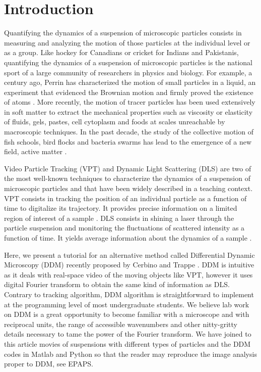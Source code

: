 \documentclass[prb,twocolumn,amsmath,amssymb]{revtex4-1}
\newcommand{\tgn}[1]{{\color{blue}#1}} %
\begin{document}
\section{\label{sec:level1}Introduction}

Quantifying the dynamics of a suspension of microscopic particles consists in measuring and analyzing the motion of those particles at the individual level or as a group. Like hockey for Canadians or cricket for Indians and Pakistanis, quantifying the dynamics of a suspension of microscopic particles is the national sport of a large community of researchers in physics and biology. For example, a century ago, Perrin has characterized the motion of small particles in a liquid, an experiment that evidenced the Brownian motion and firmly proved the existence of atoms \cite{22_perrin2014atomes}. More recently, the motion of tracer particles has been used extensively in soft matter\cite{pt1990witten, pt1964reiner} to extract the mechanical properties such as viscosity or elasticity of fluids, gels\cite{Mason1997, Chen2010}, pastes, cell cytoplasm\cite{Fabry2001,Lau2003} and foods at scales unreachable by macroscopic techniques. In the past decade, the study of the collective motion of fish schools, bird flocks and bacteria swarms has lead to the emergence of a new field, active matter \cite{Bricard2013}.

Video Particle Tracking (VPT) and Dynamic Light Scattering (DLS) \tgn{are two of the most well-known techniques to characterize} the dynamics of a suspension of microscopic particles and that have been widely described in a teaching context. VPT consists in tracking the position of an individual particle as a function of time to digitalize its trajectory. \tgn{It provides precise information on a limited region of interest of a sample} \citep{Crocker1996,ajp2013catipovic,Maurer2014}. DLS consists in shining a laser through the particle suspension and monitoring the fluctuations of scattered intensity as a function of time\cite{ajp1969clark}. It yields average information about the dynamics of a sample \citep{18_sartor2003dynamic, ajp1999goldburg,ajp1969clark}.

Here, we present a tutorial for an alternative method called Differential Dynamic Microscopy (DDM) recently proposed by Cerbino and Trappe \cite{2_DDM}. DDM is intuitive as it deals with real-space video of the moving objects like VPT, however it uses digital Fourier transform to obtain the same kind of information as DLS.  Contrary to tracking algorithm, DDM algorithm is straightforward to implement at the programming level of most undergraduate students. We believe lab work on DDM is a great opportunity to become familiar with a microscope and with reciprocal units, the range of accessible wavenumbers and other nitty-gritty details necessary to tame the power of the Fourier transform\cite{ajp1976higgins, ajp2001whiford}. We have joined to this article movies of suspensions with different types of particles and the DDM codes in Matlab and Python so that the reader may reproduce the image analysis proper to DDM, see EPAPS.
\end{document}
